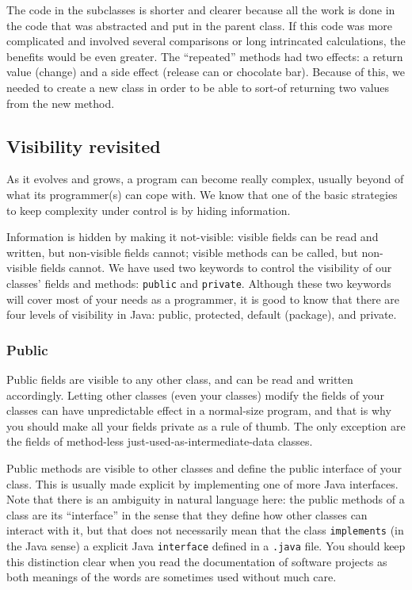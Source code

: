 {The code in the subclasses is shorter and clearer because all the work
is done in the code that was abstracted and put in the parent
class. If this code was more complicated and involved several
comparisons or long intrincated calculations, the benefits would be
even greater. The ``repeated'' methods had two effects: a return value
(change) and a side effect (release can or chocolate bar). Because of
this, we needed to create a new class in order to be able to sort-of
returning two values from the new method. 

\subsection{Visibility revisited}
\label{sec:protected-keyword}

As it evolves and grows, a program can become really complex, usually
beyond of what its programmer(s) can cope with. We know that one of
the basic strategies to keep complexity under control is by hiding
information. 

Information is hidden by making it not-visible: visible fields can be
read and written, but non-visible fields cannot; visible methods can
be called, but non-visible fields cannot.  We have used two keywords
to control the visibility of our classes' fields and methods:
\verb+public+ and \verb+private+. Although these two keywords will
cover most of your needs as a programmer, it is good to know that
there are four levels of visibility in Java: public, protected,
default (package), and private.

\subsubsection*{Public}
\label{sec:public}

Public fields are visible to any other class, and can be read and
written accordingly. Letting other classes (even your classes) modify
the fields of your classes can have unpredictable effect in a
normal-size program, and that is why you should make all your fields
private as a rule of thumb. The only exception are the fields of
method-less just-used-as-intermediate-data classes. 

Public methods are visible to other classes and define the public
interface of your class. This is usually made explicit by implementing
one of more Java interfaces. Note that there is an ambiguity in
natural language here: the public methods of a class are its ``interface''
in the sense that they define how other classes can interact with it,
but that does not necessarily mean that the class \verb+implements+
(in the Java sense) a explicit Java \verb+interface+ defined in a
\verb+.java+ file. You should keep this distinction clear when you
read the documentation of software projects as both meanings of the
words are sometimes used without much care. 

}
